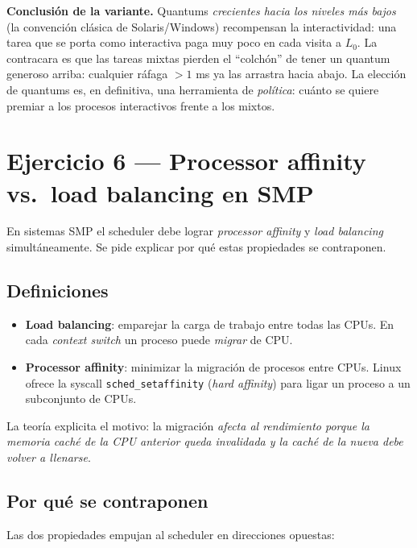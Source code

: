 \documentclass[11pt,a4paper]{article}
\begin{document}
\textbf{Conclusión de la variante.} Quantums \emph{crecientes hacia
los niveles más bajos} (la convención clásica de Solaris/Windows)
recompensan la interactividad: una tarea que se porta como
interactiva paga muy poco en cada visita a $L_0$. La contracara es
que las tareas mixtas pierden el ``colchón'' de tener un quantum
generoso arriba: cualquier ráfaga $>1$ ms ya las arrastra hacia
abajo. La elección de quantums es, en definitiva, una herramienta
de \emph{política}: cuánto se quiere premiar a los procesos
interactivos frente a los mixtos.

\section{Ejercicio 6 --- Processor affinity vs.\ load balancing en SMP}

En sistemas SMP el scheduler debe lograr \emph{processor affinity} y
\emph{load balancing} simultáneamente. Se pide explicar por qué estas
propiedades se contraponen.

\subsection*{Definiciones}

\begin{itemize}[leftmargin=*,nosep]
    \item \textbf{Load balancing}: emparejar la carga de trabajo
        entre todas las CPUs. En cada \emph{context switch} un
        proceso puede \emph{migrar} de CPU.
    \item \textbf{Processor affinity}: minimizar la migración de
        procesos entre CPUs. Linux ofrece la syscall
        \texttt{sched\_setaffinity} (\emph{hard affinity}) para
        ligar un proceso a un subconjunto de CPUs.
\end{itemize}

La teoría explicita el motivo: la migración \emph{afecta al
rendimiento porque la memoria caché de la CPU anterior queda
invalidada y la caché de la nueva debe volver a llenarse}.

\subsection*{Por qué se contraponen}

Las dos propiedades empujan al scheduler en direcciones opuestas:
\end{document}
